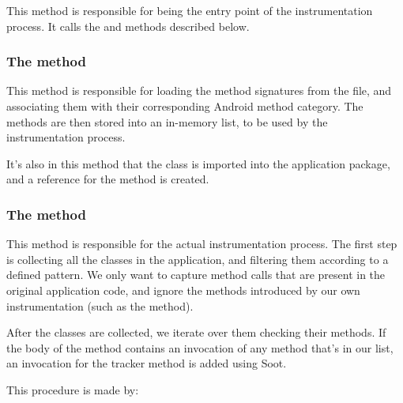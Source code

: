 This method is responsible for being the entry point of the instrumentation process. It calls the  and  methods described below.

\subsubsection{The  method}

This method is responsible for loading the method signatures from the  file, and associating them with their corresponding Android method category. The methods are then stored into an in-memory list, to be used by the instrumentation process.

It's also in this method that the  class is imported into the application package, and a reference for the  method is created.

\subsubsection{The  method}

This method is responsible for the actual instrumentation process. The first step is collecting all the classes in the application, and filtering them according to a defined pattern. We only want to capture method calls that are present in the original application code, and ignore the methods introduced by our own instrumentation (such as the  method).

After the classes are collected, we iterate over them checking their methods. If the body of the method contains an invocation of any method that's in our  list, an invocation for the  tracker method is added using Soot. 

This procedure is made by:

